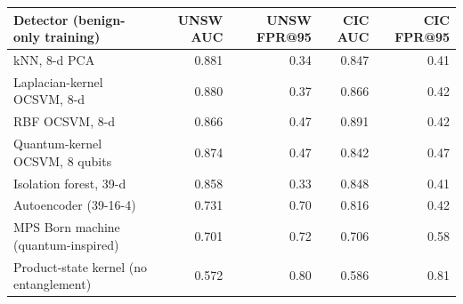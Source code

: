 \begin{tabular}{lrrrr}
\toprule
Detector (benign-only training) & UNSW AUC & UNSW FPR@95 & CIC AUC & CIC FPR@95 \\
\midrule
kNN, 8-d PCA & 0.881 & 0.34 & 0.847 & 0.41 \\
Laplacian-kernel OCSVM, 8-d & 0.880 & 0.37 & 0.866 & 0.42 \\
RBF OCSVM, 8-d & 0.866 & 0.47 & 0.891 & 0.42 \\
Quantum-kernel OCSVM, 8 qubits & 0.874 & 0.47 & 0.842 & 0.47 \\
Isolation forest, 39-d & 0.858 & 0.33 & 0.848 & 0.41 \\
Autoencoder (39-16-4) & 0.731 & 0.70 & 0.816 & 0.42 \\
MPS Born machine (quantum-inspired) & 0.701 & 0.72 & 0.706 & 0.58 \\
Product-state kernel (no entanglement) & 0.572 & 0.80 & 0.586 & 0.81 \\
\bottomrule
\end{tabular}
